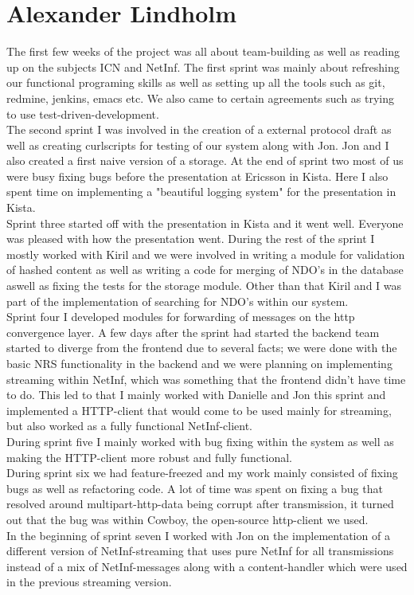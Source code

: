 \section{Alexander Lindholm}
The first few weeks of the project was all about team-building as well as reading up on the subjects ICN and NetInf. The first sprint was mainly about refreshing our functional programing skills as well as setting up all the tools such as git, redmine, jenkins, emacs etc. We also came to certain agreements such as trying to use test-driven-development. \\

The second sprint I was involved in the creation of a external protocol draft as well as creating curlscripts for testing of our system along with Jon. Jon and I also created a first naive version of a storage. At the end of sprint two most of us were busy fixing bugs before the presentation at Ericsson in Kista. Here I also spent time on implementing a "beautiful logging system" for the presentation in Kista.\\

Sprint three started off with the presentation in Kista and it went well. Everyone was pleased with how the presentation went. During the rest of the sprint I mostly worked with Kiril and we were involved in writing a module for validation of hashed content as well as writing a code for merging of NDO's in the database aswell as fixing the tests for the storage module. Other than that Kiril and I was part of the implementation of searching for NDO's within our system.\\

Sprint four I developed modules for forwarding of messages on the http convergence layer.
A few days after the sprint had started the backend team started to diverge from the frontend due to several facts;
we were done with the basic NRS functionality in the backend and we were planning on implementing streaming within NetInf, which was something that the frontend didn't have time to do. 
This led to that I mainly worked with Danielle and Jon this sprint and implemented a HTTP-client that would come to be used mainly for streaming, but also worked as a fully functional NetInf-client. \\

During sprint five I mainly worked with bug fixing within the system as well as making the HTTP-client more robust and fully functional.\\

During sprint six we had feature-freezed and my work mainly consisted of fixing bugs as well as refactoring code. A lot of time was spent on fixing a bug that resolved around multipart-http-data being corrupt after transmission, it turned out that the bug was within Cowboy, the open-source http-client we used. \\

In the beginning of sprint seven I worked with Jon on the implementation of a different version of NetInf-streaming that uses pure NetInf for all transmissions instead of a mix of NetInf-messages along with a content-handler which were used in the previous streaming version. 

